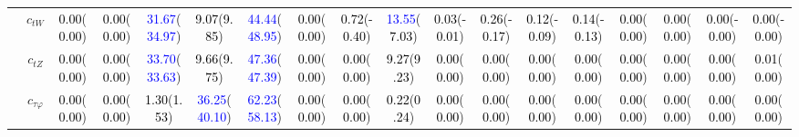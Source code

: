 \documentclass{article}
\begin{document}
\begin{landscape}
\begin{table}[H]
\begin{tabular}{|c|c|c|c|c|c|c|c|c|c|c|c|c|c|c|c|c|c|}
 & $c_{tW}$ & \textcolor{black}{0.00}(\textcolor{black}{0.00}) & \textcolor{black}{0.00}(\textcolor{black}{0.00}) & \textcolor{blue}{31.67}(\textcolor{blue}{34.97}) & \textcolor{black}{9.07}(\textcolor{black}{9.85}) & \textcolor{blue}{44.44}(\textcolor{blue}{48.95}) & \textcolor{black}{0.00}(\textcolor{black}{0.00}) & \textcolor{black}{0.72}(\textcolor{black}{-0.40}) & \textcolor{blue}{13.55}(\textcolor{black}{7.03}) & \textcolor{black}{0.03}(\textcolor{black}{-0.01}) & \textcolor{black}{0.26}(\textcolor{black}{-0.17}) & \textcolor{black}{0.12}(\textcolor{black}{-0.09}) & \textcolor{black}{0.14}(\textcolor{black}{-0.13}) & \textcolor{black}{0.00}(\textcolor{black}{0.00}) & \textcolor{black}{0.00}(\textcolor{black}{0.00}) & \textcolor{black}{0.00}(\textcolor{black}{-0.00}) & \textcolor{black}{0.00}(\textcolor{black}{-0.00})\\ \cline{2-18}
 & $c_{tZ}$ & \textcolor{black}{0.00}(\textcolor{black}{0.00}) & \textcolor{black}{0.00}(\textcolor{black}{0.00}) & \textcolor{blue}{33.70}(\textcolor{blue}{33.63}) & \textcolor{black}{9.66}(\textcolor{black}{9.75}) & \textcolor{blue}{47.36}(\textcolor{blue}{47.39}) & \textcolor{black}{0.00}(\textcolor{black}{0.00}) & \textcolor{black}{0.00}(\textcolor{black}{0.00}) & \textcolor{black}{9.27}(\textcolor{black}{9.23}) & \textcolor{black}{0.00}(\textcolor{black}{0.00}) & \textcolor{black}{0.00}(\textcolor{black}{0.00}) & \textcolor{black}{0.00}(\textcolor{black}{0.00}) & \textcolor{black}{0.00}(\textcolor{black}{0.00}) & \textcolor{black}{0.00}(\textcolor{black}{0.00}) & \textcolor{black}{0.00}(\textcolor{black}{0.00}) & \textcolor{black}{0.00}(\textcolor{black}{0.00}) & \textcolor{black}{0.01}(\textcolor{black}{0.00})\\ \cline{2-18}
 & $c_{\tau \varphi}$ & \textcolor{black}{0.00}(\textcolor{black}{0.00}) & \textcolor{black}{0.00}(\textcolor{black}{0.00}) & \textcolor{black}{1.30}(\textcolor{black}{1.53}) & \textcolor{blue}{36.25}(\textcolor{blue}{40.10}) & \textcolor{blue}{62.23}(\textcolor{blue}{58.13}) & \textcolor{black}{0.00}(\textcolor{black}{0.00}) & \textcolor{black}{0.00}(\textcolor{black}{0.00}) & \textcolor{black}{0.22}(\textcolor{black}{0.24}) & \textcolor{black}{0.00}(\textcolor{black}{0.00}) & \textcolor{black}{0.00}(\textcolor{black}{0.00}) & \textcolor{black}{0.00}(\textcolor{black}{0.00}) & \textcolor{black}{0.00}(\textcolor{black}{0.00}) & \textcolor{black}{0.00}(\textcolor{black}{0.00}) & \textcolor{black}{0.00}(\textcolor{black}{0.00}) & \textcolor{black}{0.00}(\textcolor{black}{0.00}) & \textcolor{black}{0.00}(\textcolor{black}{0.00})\\ \cline{2-18}

\end{tabular}
\end{table}
\end{landscape}
\end{document}
